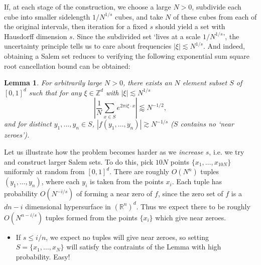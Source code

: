 \documentclass[12pt]{article}
\numberwithin{equation}{section}
\theoremstyle{plain}
\newtheorem*{lem}{Lemma}
\theoremstyle{remark}
\begin{document}
{{\begin{multicols}{2}
\begin{figure}
\end{figure}

\large{If, at each stage of the construction, we choose a large $N > 0$, subdivide each cube into smaller sidelength $1/N^{1/s}$ cubes, and take $N$ of these cubes from each of the original intervals, then iteration for a fixed $s$ should yield a set with Hausdorff dimension $s$. Since the subdivided set `lives at a scale $1/N^{1/s}$', the uncertainty principle tells us to care about frequencies $|\xi| \lesssim N^{1/s}$. And indeed, obtaining a Salem set reduces to verifying the following exponential sum square root cancellation bound can be obtained:

\begin{lem}
    For arbitrarily large $N > 0$, there exists an $N$ element subset $S$ of $[0,1]^d$ such that for any $\xi \in \mathbb{Z}^d$ with $|\xi| \lesssim N^{1/s}$
    \[ \left| \frac{1}{N} \sum_{x \in S} e^{2 \pi i \xi \cdot x} \right| \lessapprox N^{-1/2}, \]
    and for distinct $y_1,\dots,y_n \in S$, $|f(y_1,\dots,y_n)| \gtrsim N^{-1/s}$ ($S$ contains no `near zeroes').
\end{lem}

Let us illustrate how the problem becomes harder as we \emph{increase $s$}, i.e. we try and construct larger Salem sets. To do this, pick $10 N$ points $\{ x_1, \dots, x_{10N} \}$ uniformly at random from $[0,1]^d$. There are roughly $O(N^n)$ tuples $(y_1,\dots,y_n)$, where each $y_i$ is taken from the points $x_i$. Each tuple has probability $O(N^{-i/s})$ of forming a near zero of $f$, since the zero set of $f$ is a $dn - i$ dimensional hypersurface in $(\mathbb{R}^n)^d$. Thus we expect there to be roughly $O(N^{n-i/s})$ tuples formed from the points $\{ x_i \}$ which give near zeroes.
%
\begin{itemize}
    \item If $s \leq i/n$, we expect no tuples will give near zeroes, so setting $S = \{ x_1, \dots, x_N \}$ will satisfy the contraints of the Lemma with high probability. Easy!


\end{itemize}}
\end{multicols}}}
\end{document}

